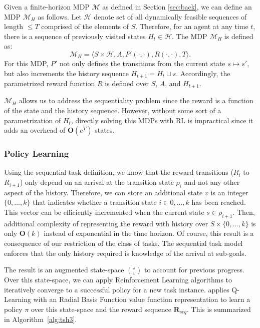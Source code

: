 Given a finite-horizon MDP $\mathcal{M}$ as defined in Section \ref{sec:back}, we can define an MDP $\mathcal{M}_H$ as follows.
Let $\mathcal{H}$ denote set of all dynamically feasible sequences of length $\le T$ comprised of the elements of $S$.
Therefore, for an agent at any time $t$, there is a sequence of previously visited states $H_t \in \mathcal{H}$.
The MDP $\mathcal{M}_H$ is defined as:
\[
\mathcal{M}_H = \langle S \times \mathcal{H},A,P'(\cdot,\cdot), R(\cdot,\cdot),T \rangle.
\]
For this MDP, $P'$ not only defines the transitions from the current state $s \mapsto s'$, but also increments the history sequence $H_{t+1} = H_{t} \sqcup s$.
Accordingly, the parametrized reward function $R$ is defined over $S$, $A$, and $H_{t+1}$.

$\mathcal{M}_H$ allows us to address the sequentiality problem since the reward is a function of the state and the history sequence.
However, without some sort of a parametrization of $H_t$, directly solving this MDPs with RL is impractical since it adds an overhead of $\mathbf{O}(e^{T})$ states.

\vspace{-15pt}
\subsubsection{Policy Learning}
Using the sequential task definition, we know that the reward transitions ($R_{i}$ to $R_{i+1}$) only depend on an arrival at the transition state $\rho_{i}$ and not any other aspect of the history.
Therefore, we can store an additional state $v$ is an integer $\{0,...,k\}$ that indicates whether a transition state $i \in 0,...,k$ has been reached.
This vector can be efficiently incremented when the current state $s \in \rho_{i+1}$.
Then, additional complexity of representing the reward with history over $S \times  \{0,...,k\}$ is only $\mathbf{O}(k)$ instead of exponential in the time horizon.
Of course, this result is a consequence of our restriction of the class of tasks.
The sequential task model enforces that the only history required is knowledge of the arrival at sub-goals.

The result is an augmented state-space $\binom{s}{v}$ to account for previous progress.
Over this state-space, we can apply Reinforcement Learning algorithms to iteratively converge to a successful policy for a new task instance.
\hirl applies Q-Learning with an Radial Basis Function value function representation to learn a policy $\pi$ over this state-space and the reward sequence $\mathbf{R}_{seq}$.
This is summarized in Algorithm~\ref{alg:tsh3}.
